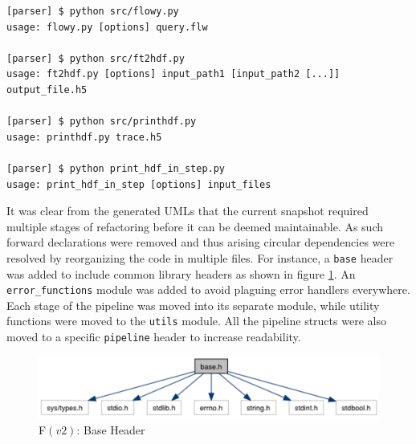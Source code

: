 \begin{lstlisting}
[parser] $ python src/flowy.py
usage: flowy.py [options] query.flw

[parser] $ python src/ft2hdf.py
usage: ft2hdf.py [options] input_path1 [input_path2 [...]] output_file.h5

[parser] $ python src/printhdf.py
usage: printhdf.py trace.h5

[parser] $ python print_hdf_in_step.py
usage: print_hdf_in_step [options] input_files
\end{lstlisting}

It was clear from the generated \ac{UML}s that the current snapshot required
multiple stages of refactoring before it can be deemed maintainable. As such
forward declarations were removed and thus arising circular dependencies were
resolved by reorganizing the code in multiple files. For   instance, a \texttt{base} header was added to include common library
headers as shown in figure \ref{fig:base-header}.  An
\texttt{error\_functions} module was added to avoid plaguing error handlers
everywhere. Each stage of the pipeline was moved into its separate module,
while utility functions were moved to the \texttt{utils} module. All the
pipeline structs were also moved to a specific \texttt{pipeline} header to
increase readability.

\begin{figure}[h!]
  \begin{center}
    \includegraphics* [width=1.0\linewidth]{figures/base-header}
    \caption{F$(v2)$: Base Header}
    \label{fig:base-header}
    \end{center}
\end{figure}
